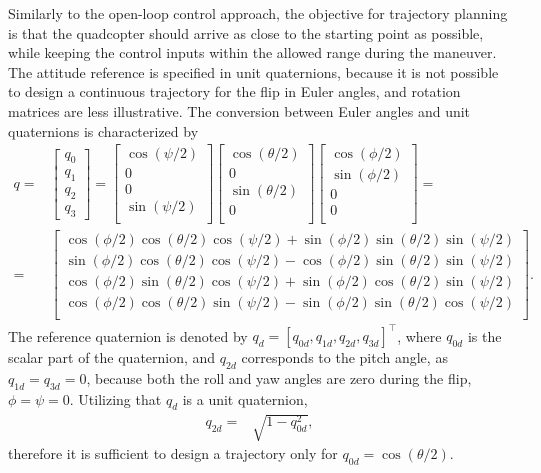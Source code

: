 Similarly to the open-loop control approach, the objective for trajectory planning is that the quadcopter should arrive as close to the starting point as possible, while keeping the control inputs within the allowed range during the maneuver. The attitude reference is specified in unit quaternions, because it is not possible to design a continuous trajectory for the flip in Euler angles, and rotation matrices are less illustrative. The conversion between Euler angles and unit quaternions is characterized by \cite{quaternion}
\begin{equation}\label{eq:eul2quat}
\begin{split}
    q =&\begin{bmatrix} q_0\\q_1\\q_2\\q_3 \end{bmatrix}={\begin{bmatrix}\cos(\psi /2)\\0\\0\\\sin(\psi /2)\\\end{bmatrix}}{\begin{bmatrix}\cos(\theta /2)\\0\\\sin(\theta /2)\\0\\\end{bmatrix}}{\begin{bmatrix}\cos(\phi /2)\\\sin(\phi /2)\\0\\0\\\end{bmatrix}}=\\=&{\begin{bmatrix}\cos(\phi /2)\cos(\theta /2)\cos(\psi /2)+\sin(\phi /2)\sin(\theta /2)\sin(\psi /2)\\\sin(\phi /2)\cos(\theta /2)\cos(\psi /2)-\cos(\phi /2)\sin(\theta /2)\sin(\psi /2)\\\cos(\phi /2)\sin(\theta /2)\cos(\psi /2)+\sin(\phi /2)\cos(\theta /2)\sin(\psi /2)\\\cos(\phi /2)\cos(\theta /2)\sin(\psi /2)-\sin(\phi /2)\sin(\theta /2)\cos(\psi /2)\\\end{bmatrix}}.
\end{split}
\end{equation}
The reference quaternion is denoted by $q_d = [q_{0d}, q_{1d}, q_{2d}, q_{3d}]^\top$, where $q_{0d}$ is the scalar part of the quaternion, and $q_{2d}$ corresponds to the pitch angle, as $q_{1d}=q_{3d}=0$, because both the roll and yaw angles are zero during the flip, $\phi=\psi=0$. Utilizing that $q_d$ is a unit quaternion, 
\begin{align}
    q_{2d} = &\sqrt{1-q_{0d}^2},
\end{align}
therefore it is sufficient to design a trajectory only for $q_{0d}=\cos(\theta/2)$. 

